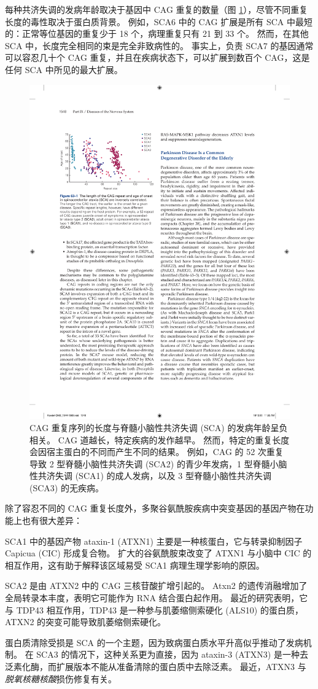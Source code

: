 每种共济失调的发病年龄取决于基因中 CAG 重复的数量（图 \ref{fig:63_1}），尽管不同重复长度的毒性取决于蛋白质背景。
例如，SCA6 中的 CAG 扩展是所有 SCA 中最短的：正常等位基因的重复少于 18 个，病理重复只有 21 到 33 个。
然而，在其他 SCA 中，长度完全相同的束是完全非致病性的。
事实上，负责 SCA7 的基因通常可以容忍几十个 CAG 重复，并且在疾病状态下，可以扩展到数百个 CAG，这是任何 SCA 中所见的最大扩展。



\begin{figure}[htbp]
	\centering
	\includegraphics[width=0.5\linewidth]{chap63/fig_63_1}
	\caption{CAG 重复序列的长度与脊髓小脑性共济失调 (SCA) 的发病年龄呈负相关。 CAG 道越长，特定疾病的发作越早。 然而，特定的重复长度会因宿主蛋白的不同而产生不同的结果。 例如，CAG 的 52 次重复导致 2 型脊髓小脑性共济失调 (SCA2) 的青少年发病，1 型脊髓小脑性共济失调 (SCA1) 的成人发病，以及 3 型脊髓小脑性共济失调 (SCA3) 的无疾病。}
	\label{fig:63_1}
\end{figure}


除了容忍不同的 CAG 重复长度外，多聚谷氨酰胺疾病中突变基因的基因产物在功能上也有很大差异：


SCA1 中的基因产物 ataxin-1 (ATXN1) 主要是一种核蛋白，它与转录抑制因子 Capicua (CIC) 形成复合物。
扩大的谷氨酰胺束改变了 ATXN1 与小脑中 CIC 的相互作用，这有助于解释该区域易受 SCA1 病理生理学影响的原因。


SCA2 是由 ATXN2 中的 CAG 三核苷酸扩增引起的。 Atxn2 的遗传消融增加了全局转录本丰度，表明它可能作为 RNA 结合蛋白起作用。
最近的研究表明，它与 TDP43 相互作用，TDP43 是一种参与肌萎缩侧索硬化 (ALS10) 的蛋白质，ATXN2 的突变可能导致肌萎缩侧索硬化。


蛋白质清除受损是 SCA 的一个主题，因为致病蛋白质水平升高似乎推动了发病机制。
在 SCA3 的情况下，这种关系更为直接，因为 ataxin-3 (ATXN3) 是一种去泛素化酶，而扩展版本不能从准备清除的蛋白质中去除泛素。
最近，ATXN3 与\textit{脱氧核糖核酸}损伤修复有关。



